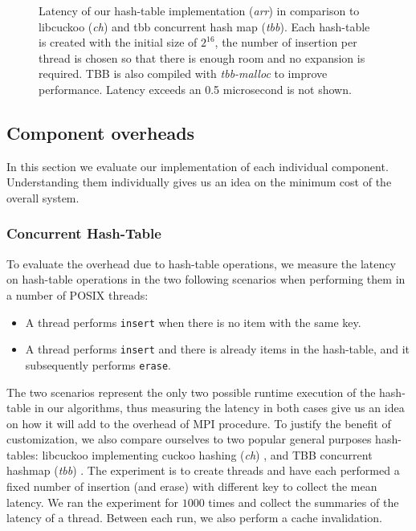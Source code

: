 \begin{figure*}[ht]
  \caption{Latency of our hash-table implementation (\textit{arr}) in comparison
  to libcuckoo (\textit{ch}) and tbb concurrent hash map (\textit{tbb}).  Each
  hash-table is created with the initial size of $2^{16}$, the number of
  insertion per thread is chosen so that there is enough room and no expansion is
  required. TBB is also compiled with \textit{tbb-malloc} to improve performance.
  Latency exceeds an 0.5 microsecond is not shown.\label{fig:hash-table}}

\end{figure*}

\subsection{Component overheads}
In this section we evaluate our implementation of each individual component.
Understanding them individually gives us an idea on the minimum cost of the overall
system. 
\subsubsection{Concurrent Hash-Table}
To evaluate the overhead due to hash-table operations, we measure the latency 
on hash-table operations in the two following scenarios when performing them
in a number of POSIX threads:

\begin{itemize}
  \item A thread performs \texttt{insert} when there is no item with the same key.
  \item A thread performs \texttt{insert} and there is already items in the hash-table, and it subsequently
    performs \texttt{erase}.
\end{itemize}

 The two scenarios represent the only two possible runtime execution of the
 hash-table in our algorithms, thus measuring the latency in both cases give us
 an idea on how it will add to the overhead of MPI procedure. To justify the
 benefit of customization, we also compare ourselves to two popular general
 purposes hash-tables: libcuckoo implementing cuckoo hashing (\textit{ch})
 \cite{chasing}, and TBB concurrent hashmap (\textit{tbb}) \cite{tbb}. The
 experiment is to create threads and have each performed a fixed number of
 insertion (and erase) with different key to collect the mean latency. We ran
 the experiment for $1000$ times and collect the summaries of the latency of a
 thread. Between each run, we also perform a cache invalidation.


